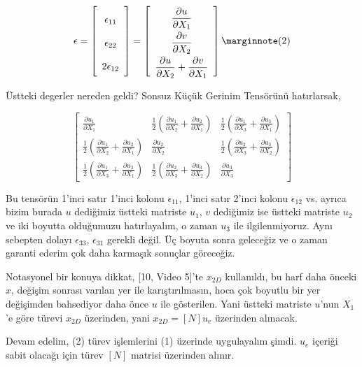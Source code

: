 \documentclass[12pt,fleqn]{article}\usepackage{../../common}
\begin{document}
$$
\epsilon = \left[\begin{array}{c}
\epsilon_{11} \\ \epsilon_{22} \\ 2 \epsilon_{12} 
\end{array}\right]
\renewcommand*{\arraystretch}{2.0}
= \left[\begin{array}{c}
\dfrac{\partial u}{\partial X_1} \\
\dfrac{\partial v}{\partial X_2} \\
\dfrac{\partial u}{\partial X_2} + \dfrac{\partial v}{\partial X_1} 
\end{array}\right]
\mlabel{2}
$$

Üstteki degerler nereden geldi? Sonsuz Küçük Gerinim Tensörünü hatırlarsak,

$$
\left[\begin{array}{ccc}
  \frac{\partial u_1}{\partial X_1} &
  \frac{1}{2}(\frac{\partial u_1}{\partial X_2} + \frac{\partial u_2}{\partial X_1} ) & 
  \frac{1}{2}(\frac{\partial u_1}{\partial X_3} + \frac{\partial u_3}{\partial  X_1} )
\\
  \frac{1}{2}(\frac{\partial u_1}{\partial X_2} + \frac{\partial u_2}{\partial X_1} ) &
  \frac{\partial u_2}{\partial X_2} &
  \frac{1}{2}(\frac{\partial u_2}{\partial X_3} + \frac{\partial u_3}{\partial X_2} )
\\
  \frac{1}{2}(\frac{\partial u_1}{\partial X_3} + \frac{\partial u_3}{\partial X_1} ) &
  \frac{1}{2}(\frac{\partial u_2}{\partial X_3} + \frac{\partial u_3}{\partial X_2} ) &
  \frac{\partial u_3}{\partial X_3} 
\end{array}\right]
$$

Bu tensörün 1'inci satır 1'inci kolonu $\epsilon_{11}$, 1'inci satır 2'inci
kolonu $\epsilon_{12}$ vs. ayrıca bizim burada $u$ dediğimiz üstteki matriste
$u_1$, $v$ dediğimiz ise üstteki matriste $u_2$ ve iki boyutta olduğumuzu
hatırlayalım, o zaman $u_3$ ile ilgilenmiyoruz. Aynı sebepten dolayı
$\epsilon_{33}$, $\epsilon_{31}$ gerekli değil. Üç boyuta sonra geleceğiz ve o
zaman garanti ederim çok daha karmaşık sonuçlar göreceğiz.

Notasyonel bir konuya dikkat, [10, Video 5]'te $x_{2D}$ kullanıldı, bu harf daha
önceki $x$, değişim sonrası varılan yer ile karıştırılmasın, hoca çok boyutlu
bir yer değişimden bahsediyor daha önce $u$ ile gösterilen.  Yani üstteki
matriste $u$'nun $X_1$'e göre türevi $x_{2D}$ üzerinden, yani $x_{2D} = [N] u_e$
üzerinden alınacak.

Devam edelim, (2) türev işlemlerini (1) üzerinde uygulayalım şimdi. $u_e$ içeriği
sabit olacağı için türev $[N]$ matrisi üzerinden alınır.
\end{document}
